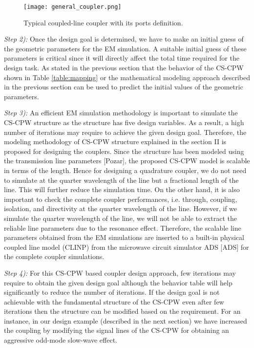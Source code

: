 \documentclass[journal]{IEEEtran}
\begin{document}
\begin{figure}
	\texttt{[image: general\_coupler.png]}
	\caption{Typical coupled-line coupler with its ports definition.}
	\label{bcoupler}
\end{figure}


\textit{Step 2):} Once the design goal is determined, we have to make an initial guess of the geometric parameters for the EM simulation. A suitable initial guess of these parameters is critical since it will directly affect the total time required for the design task. As stated in the previous section that the behavior of the CS-CPW shown in Table \ref{table:mapping} or the mathematical modeling approach described in the previous section can be used to predict the initial values of the geometric parameters.

\textit{Step 3):} An efficient EM simulation methodology is important to simulate the CS-CPW structure as the structure has five design variables. As a result, a high number of iterations may require to achieve the given design goal. Therefore, the modeling methodology of CS-CPW structure explained in the section II is proposed for designing the couplers. Since the structure has been modeled using the transmission line parameters [Pozar], the proposed CS-CPW model is scalable in terms of the length. Hence for designing a quadrature coupler, we do not need to simulate at the quarter wavelength of the line but a fractional length of the line. This will further reduce the simulation time. On the other hand, it is also important to check the complete coupler performances, i.e. through, coupling, isolation, and directivity at the quarter wavelength of the line. However, if we simulate the quarter wavelength of the line, we will not be able to extract the reliable line parameters due to the resonance effect. Therefore, the scalable line parameters obtained from the EM simulations are inserted to a built-in physical coupled line model (CLINP) from the microwave circuit simulator ADS [ADS] for the complete coupler simulations. 

\textit{Step 4):} For this CS-CPW based coupler design approach, few iterations may require to obtain the given design goal although the behavior table will help significantly to reduce the number of iterations. If the design goal is not achievable with the fundamental structure of the CS-CPW even after few iterations then the structure can be modified based on the requirement. For an instance, in our design example (described in the next section) we have increased the coupling by modifying the signal lines of the CS-CPW for obtaining an aggressive odd-mode slow-wave effect.
\end{document}
